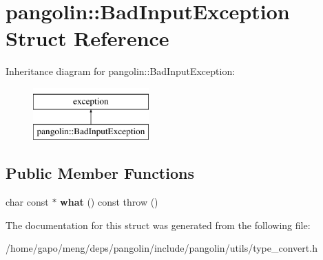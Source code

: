 \hypertarget{structpangolin_1_1_bad_input_exception}{}\section{pangolin\+:\+:Bad\+Input\+Exception Struct Reference}
\label{structpangolin_1_1_bad_input_exception}
Inheritance diagram for pangolin\+:\+:Bad\+Input\+Exception\+:\begin{figure}[H]
\begin{center}
\leavevmode
\includegraphics[height=2.000000cm]{structpangolin_1_1_bad_input_exception}
\end{center}
\end{figure}
\subsection*{Public Member Functions}
\begin{DoxyCompactItemize}
\item 
char const $\ast$ {\bfseries what} () const   throw ()\hypertarget{structpangolin_1_1_bad_input_exception_a78f0d2f6e381b900258c8fd161fc6f69}{}\label{structpangolin_1_1_bad_input_exception_a78f0d2f6e381b900258c8fd161fc6f69}

\end{DoxyCompactItemize}


The documentation for this struct was generated from the following file\+:\begin{DoxyCompactItemize}
\item 
/home/gapo/meng/deps/pangolin/include/pangolin/utils/type\+\_\+convert.\+h\end{DoxyCompactItemize}

